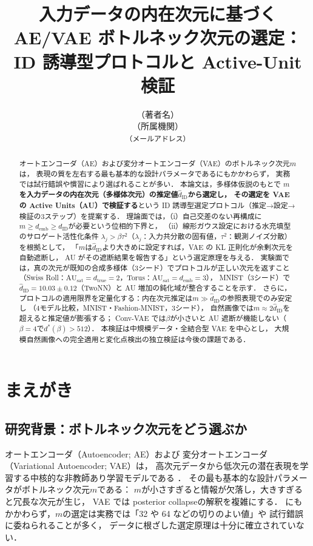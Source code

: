 \documentclass[11pt,a4paper]{jsarticle}
\title{入力データの内在次元に基づく AE/VAE ボトルネック次元の選定：\\
ID 誘導型プロトコルと Active-Unit 検証}
\author{（著者名）\\
{\small （所属機関）}\\
{\small \texttt{（メールアドレス）}}}
\date{}
\newcommand{\dID}{d_{\mathrm{ID}}}
\newcommand{\hatdID}{\hat{d}_{\mathrm{ID}}}
\newcommand{\dtrue}{d_{\mathrm{true}}}
\newcommand{\AUsat}{\mathrm{AU}_{\mathrm{sat}}}
\newcommand{\demb}{d_{\mathrm{emb}}}
\newcommand{\dstar}{d^{*}(\beta)}
\begin{document}
\maketitle

\begin{abstract}
オートエンコーダ（AE）および変分オートエンコーダ（VAE）のボトルネック次元$m$は，
表現の質を左右する最も基本的な設計パラメータであるにもかかわらず，
実務では試行錯誤や慣習により選ばれることが多い．
本論文は，多様体仮説のもとで
\textbf{$m$を入力データの内在次元（多様体次元）の推定値$\hatdID$から選定し，
その選定を VAE の Active Units（AU）で検証する}という
ID 誘導型選定プロトコル（推定→設定→検証の3ステップ）を提案する．
理論面では，（i）自己交差のない再構成に$m \geq \demb \geq \dID$が必要という位相的下界と，
（ii）線形ガウス設定における水充填型のサロゲート活性化条件
$\lambda_j > \beta\tau^2$（$\lambda_j$：入力共分散の固有値，$\tau^2$：観測ノイズ分散）を根拠として，
「$m$は$\hatdID$より大きめに設定すれば，VAE の KL 正則化が余剰次元を自動遮断し，
AU がその遮断結果を報告する」という選定原理を与える．
実験面では，真の次元が既知の合成多様体（3シード）でプロトコルが正しい次元を返すこと
（Swiss Roll：$\AUsat = \dtrue = 2$，Torus：$\AUsat = \demb = 3$），
MNIST（3シード）で$\hatdID = 10.03 \pm 0.12$（TwoNN）と AU 増加の鈍化域が整合することを示す．
さらに，プロトコルの適用限界を定量化する：内在次元推定は$m \gg \hatdID$の参照表現でのみ安定し
（4モデル比較，MNIST・Fashion-MNIST，3シード），
自然画像では$m \approx 2\hatdID$を超えると推定値が膨張する；
Conv-VAE では$\beta$が小さいと AU 遮断が機能しない（$\beta=4$で$\dstar > 512$）．
本検証は中規模データ・全結合型 VAE を中心とし，
大規模自然画像への完全適用と変化点検出の独立検証は今後の課題である．
\end{abstract}

\section{まえがき}\label{sec:intro}

\subsection{研究背景：ボトルネック次元をどう選ぶか}\label{sec:intro_bg}

オートエンコーダ（Autoencoder; AE）および
変分オートエンコーダ（Variational Autoencoder; VAE）\cite{kingma2014vae}は，
高次元データから低次元の潜在表現を学習する中核的な非教師あり学習モデルである
\cite{bengio2013representation}．
その最も基本的な設計パラメータがボトルネック次元$m$である：
$m$が小さすぎると情報が欠落し，大きすぎると冗長な次元が生じ，
VAE では posterior collapse\cite{lucas2019elbo}の解釈を複雑にする．
にもかかわらず，$m$の選定は実務では「32 や 64 などの切りのよい値」や
試行錯誤に委ねられることが多く，
データに根ざした選定原理は十分に確立されていない．
\end{document}
